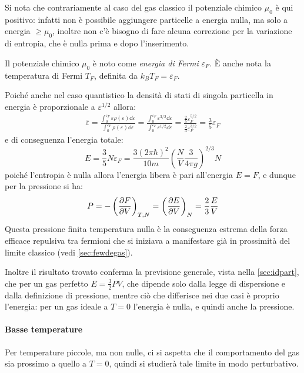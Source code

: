 Si nota che contrariamente al caso del gas classico il potenziale chimico $\mu_0$ è qui positivo: infatti non è possibile aggiungere particelle a energia nulla, ma solo a energia $\geq \mu_0$, inoltre non c'è bisogno di fare alcuna correzione per la variazione di entropia, che è nulla prima e dopo l'inserimento.

Il potenziale chimico $\mu_0$ è noto come \textit{energia di Fermi} $\varepsilon_F$. \`E anche nota la temperatura di Fermi $T_F$, definita da $k_B T_F = \varepsilon_F$.
\newline

Poiché anche nel caso quantistico la densità di stati di singola particella in energia è proporzionale a $\varepsilon^{1/2}$ allora:
\begin{align*}
	\bar{\varepsilon} = \frac{\int_{0}^{\varepsilon_F} \varepsilon \rho(\varepsilon) \dd \varepsilon}{\int_{0}^{\varepsilon_F} \rho(\varepsilon) \dd \varepsilon} = \frac{\int_{0}^{\varepsilon_F} \varepsilon^{3/2} \dd \varepsilon}{\int_{0}^{\varepsilon_F} \varepsilon^{1/2} \dd \varepsilon} = \frac{\frac{2}{5} \varepsilon_F^{5/2}}{\frac{2}{3} \varepsilon_F^{3/2}} = \frac{3}{5} \varepsilon_F
\end{align*}
e di conseguenza l'energia totale:
\begin{equation*}
E = \frac{3}{5} N \varepsilon_F = \frac{3(2\pi \hbar)^2}{10m} \left(\frac{N}{V} \frac{3}{4\pi g}\right)^{2/3} N
\end{equation*}
poiché l'entropia è nulla allora l'energia libera è pari all'energia $E=F$, e dunque per la pressione si ha:
\begin{equation}
P = - \left(\frac{\partial {F}}{\partial {V}}\right)_{T,N} =\left(\frac{\partial {E}}{\partial {V}}\right)_{N} = \frac{2}{3} \frac{E}{V}
\end{equation}
Questa pressione finita temperatura nulla è la conseguenza estrema della forza efficace repulsiva tra fermioni che si iniziava a manifestare già in prossimità del limite classico (vedi \cref{sec:fewdegas}).

Inoltre il risultato trovato conferma la previsione generale, vista nella \cref{sec:idpart}, che per un gas perfetto $ E = \frac{3}{2} PV$, che dipende solo dalla legge di dispersione e dalla definizione di pressione, mentre ciò che differisce nei due casi è proprio l'energia: per un gas ideale a $T=0$ l'energia è nulla, e quindi anche la pressione.

\paragraph{Basse temperature} Per temperature piccole, ma non nulle, ci si aspetta che il comportamento del gas sia prossimo a quello a $T=0$, quindi si studierà tale limite in modo perturbativo.

